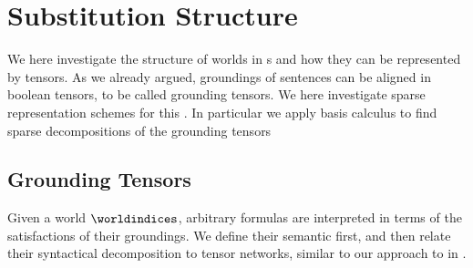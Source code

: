 
\section{Substitution Structure}

We here investigate the structure of worlds in \firstOrderLogic{}s and how they can be represented by tensors.
As we already argued, groundings of sentences can be aligned in boolean tensors, to be called grounding tensors.
We here investigate sparse representation schemes for this \substitutionStructure{}.
In particular we apply basis calculus to find sparse decompositions of the grounding tensors





\subsection{Grounding Tensors}

Given a \firstOrderLogic{} world $\worldindices$, arbitrary formulas are interpreted in terms of the satisfactions of their groundings.
We define their semantic first, and then relate their syntactical decomposition to tensor networks, similar to our approach to \propositionalLogic{} in .

